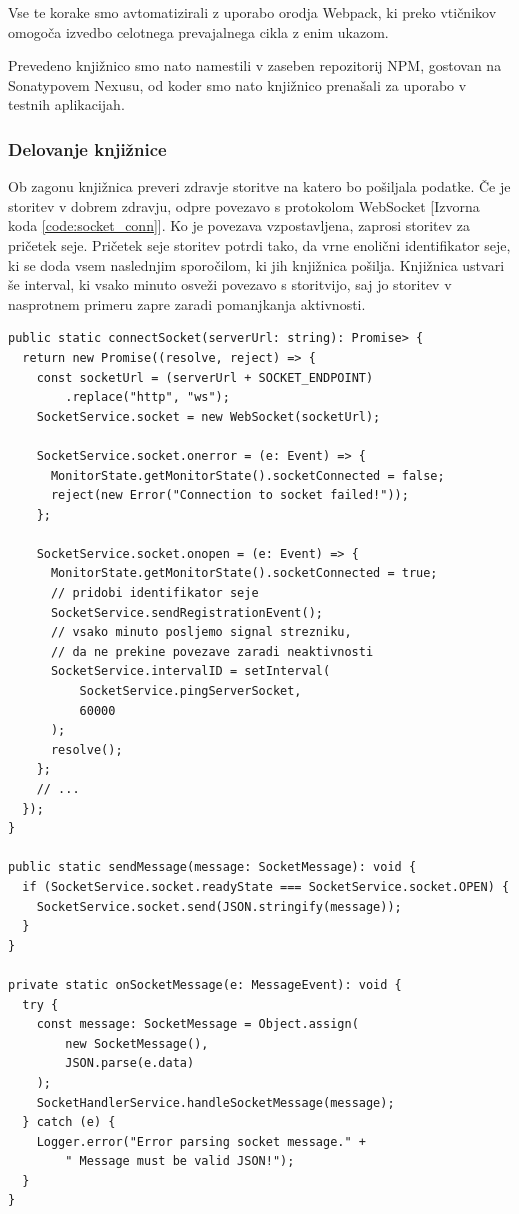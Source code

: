 \documentclass[a4paper, 12pt]{book}
\begin{document}
Vse te korake smo avtomatizirali z uporabo orodja Webpack, ki preko vtičnikov omogoča izvedbo celotnega prevajalnega cikla z enim ukazom. 

Prevedeno knjižnico smo nato namestili v zaseben repozitorij NPM, gostovan na Sonatypovem Nexusu, od koder smo nato knjižnico prenašali za uporabo v testnih aplikacijah.

\subsubsection{Delovanje knjižnice}

Ob zagonu knjižnica preveri zdravje storitve na katero bo pošiljala podatke. Če je storitev v dobrem zdravju, odpre povezavo s protokolom WebSocket [Izvorna koda \ref{code:socket_conn}]. Ko je povezava vzpostavljena, zaprosi storitev za pričetek seje. Pričetek seje storitev potrdi tako, da vrne enolični identifikator seje, ki se doda vsem naslednjim sporočilom, ki jih knjižnica pošilja. Knjižnica ustvari še interval, ki vsako minuto osveži povezavo s storitvijo, saj jo storitev v nasprotnem primeru zapre zaradi pomanjkanja aktivnosti.

\begin{lstlisting}[label=code:socket_conn, caption=Odpiranje WebSocket povezave in metode za upravljanje WebSocket akcij]
public static connectSocket(serverUrl: string): Promise> {
  return new Promise((resolve, reject) => {
    const socketUrl = (serverUrl + SOCKET_ENDPOINT)
        .replace("http", "ws");
    SocketService.socket = new WebSocket(socketUrl);

    SocketService.socket.onerror = (e: Event) => {
      MonitorState.getMonitorState().socketConnected = false;
      reject(new Error("Connection to socket failed!"));
    };

    SocketService.socket.onopen = (e: Event) => {
      MonitorState.getMonitorState().socketConnected = true;
      // pridobi identifikator seje
      SocketService.sendRegistrationEvent();
      // vsako minuto posljemo signal strezniku,
      // da ne prekine povezave zaradi neaktivnosti
      SocketService.intervalID = setInterval(
          SocketService.pingServerSocket,
          60000
      );
      resolve();
    };
    // ... 
  });
}

public static sendMessage(message: SocketMessage): void {
  if (SocketService.socket.readyState === SocketService.socket.OPEN) {
    SocketService.socket.send(JSON.stringify(message));
  }
}

private static onSocketMessage(e: MessageEvent): void {
  try {
    const message: SocketMessage = Object.assign(
        new SocketMessage(),
        JSON.parse(e.data)
    );
    SocketHandlerService.handleSocketMessage(message);
  } catch (e) {
    Logger.error("Error parsing socket message." +
        " Message must be valid JSON!");
  }
}
\end{lstlisting}
\end{document}
